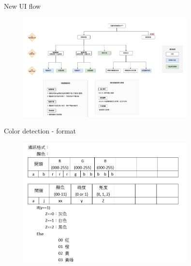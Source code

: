 \documentclass{beamer}
\begin{document}
\begin{frame} {New UI flow}  
    \begin{figure}[t]
    \centering
    \includegraphics[width=0.8\textwidth]{figures/uiflow.png}
    \end{figure}
\end{frame}
\begin{frame} {Color detection - format}  
    \begin{figure}[t]
    \centering
    \includegraphics[width=0.8\textwidth]{figures/commformat.png}
    \end{figure}
\end{frame}
\end{document}
